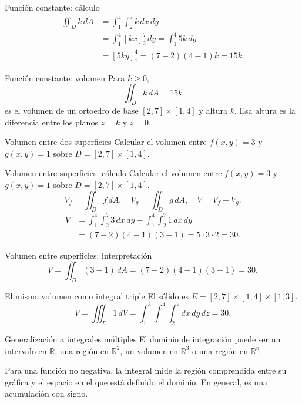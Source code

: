 \documentclass[main.tex]{subfiles}
\begin{document}
\begin{frame}{Función constante: cálculo}
\begin{align*}\iint_Dk\,dA&=\int_1^4\int_2^7k\,dx\,dy\\&=\int_1^4[kx]_2^7\,dy=\int_1^4 5k\,dy\\&=[5ky]_1^4=(7-2)(4-1)k=15k.\end{align*}
\end{frame}

\begin{frame}{Función constante: volumen}
Para $k\ge0$,\[\iint_D k\,dA=15k\]es el volumen de un ortoedro de base $[2,7]\times[1,4]$ y altura $k$. Esa altura es la diferencia entre los planos $z=k$ y $z=0$.
\end{frame}

\begin{frame}{Volumen entre dos superficies}
Calcular el volumen entre $f(x,y)=3$ y $g(x,y)=1$ sobre $D=[2,7]\times[1,4]$.
\end{frame}

\begin{frame}{Volumen entre superficies: cálculo}
\small Calcular el volumen entre $f(x,y)=3$ y $g(x,y)=1$ sobre $D=[2,7]\times[1,4]$.\[V_f=\iint_D f\,dA,\quad V_g=\iint_Dg\,dA,\quad V=V_f-V_g.\]\begin{align*}V&=\int_1^4\int_2^7 3\,dx\,dy-\int_1^4\int_2^7 1\,dx\,dy\\&=(7-2)(4-1)(3-1)=5\cdot3\cdot2=30.\end{align*}
\end{frame}

\begin{frame}{Volumen entre superficies: interpretación}
\[V=\iint_D(3-1)\,dA=(7-2)(4-1)(3-1)=30.\]
\end{frame}

\begin{frame}{El mismo volumen como integral triple}
El sólido es $E=[2,7]\times[1,4]\times[1,3]$.\[V=\iiint_E1\,dV=\int_1^3\int_1^4\int_2^7dx\,dy\,dz=30.\]
\end{frame}

\begin{frame}{Generalización a integrales múltiples}
El dominio de integración puede ser un intervalo en $\mathbb R$, una región en $\mathbb R^2$, un volumen en $\mathbb R^3$ o una región en $\mathbb R^n$.\par\medskip Para una función no negativa, la integral mide la región comprendida entre su gráfica y el espacio en el que está definido el dominio. En general, es una acumulación con signo.
\end{frame}
\end{document}

